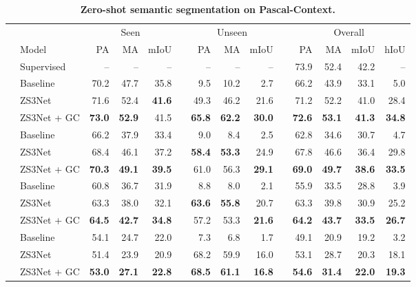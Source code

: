 \documentclass{article}
\begin{document}
\begin{table}
\caption{\small \textbf{Zero-shot semantic segmentation on Pascal-Context.}\vspace{3pt}}
\setlength{\tabcolsep}{5pt}
\small{
\begin{tabular}{clrrrrrrrrrrrr} \toprule
& & \multicolumn{3}{c}{Seen} && \multicolumn{3}{c}{Unseen} && \multicolumn{4}{c}{Overall}     \\\cline{3-5} \cline{7-9} \cline{11-14}\noalign{\smallskip}
 &Model           & PA    &MA    & mIoU  && PA    & MA    & mIoU    && PA    & MA   & mIoU  & hIoU \\ \midrule[1.1pt] 
&Supervised & -- & --  & -- && -- & -- & -- && 73.9  & 52.4 & 42.2 & -- \\ \hline\noalign{\smallskip}
\multirow{4}{*}{2} & Baseline & 70.2 & 47.7 & 35.8 && 9.5 & 10.2  & 2.7 && 66.2  & 43.9 & 33.1 &5.0 \\ 
&  ZS3Net & 71.6 &  52.4  & \bf 41.6 && 49.3  &   46.2  & 21.6 &&  71.2 & 52.2 &  41.0   & 28.4\\
&  ZS3Net + GC &  \bf 73.0 & \bf 52.9  &  41.5 && \bf 65.8  \bf  &  \bf 62.2  & \bf 30.0 && \bf 72.6  & \bf 53.1 & \bf 41.3 & \bf 34.8 \\ 
\hline\noalign{\smallskip}
\multirow{4}{*}{4} & Baseline & 66.2 & 37.9  & 33.4 && 9.0 & 8.4 & 2.5 && 62.8 & 34.6 & 30.7 & 4.7 \\ 
&  ZS3Net & 68.4 & 46.1  &  37.2 && \bf 58.4  \bf  &  \bf 53.3  &  24.9  &&  67.8 &  46.6 & 36.4 &  29.8 \\
&  ZS3Net + GC & \bf 70.3 & \bf 49.1  & \bf 39.5 &&  61.0  &  56.3  & \bf 29.1 && \bf 69.0 & \bf 49.7 & \bf 38.6 & \bf  33.5  \\ 
\hline\noalign{\smallskip}
\multirow{4}{*}{6} & Baseline &  60.8 & 36.7  & 31.9 && 8.8 & 8.0 & 2.1  && 55.9  & 33.5 & 28.8 & 3.9 \\ 
&  ZS3Net  &  63.3 &  38.0  &   32.1 && \bf  63.6  &  \bf 55.8 &  20.7 &&  63.3 &  39.8 & 30.9 &  25.2\\
&  ZS3Net + GC  & \bf 64.5  & \bf 42.7   & \bf 34.8 &&  57.2 &  53.3  & \bf 21.6  && \bf 64.2 & \bf 43.7  & \bf 33.5 & \bf 26.7 \\ \hline\noalign{\smallskip}
\multirow{4}{*}{8} & Baseline & 54.1 & 24.7  & 22.0 && 7.3 & 6.8 & 1.7 && 49.1 & 20.9 & 19.2 & 3.2 \\ 
&  ZS3Net  & 51.4 &  23.9 &  20.9   &&  68.2 \bf  & 59.9 \bf  &  16.0\bf  &&  53.1 &  28.7  &  20.3 & 18.1 \\
&  ZS3Net + GC  &  \bf 53.0  & \bf 27.1  & \bf 22.8 &&  \bf 68.5  &  \bf 61.1  & \bf 16.8 && \bf  54.6 & \bf 31.4  & \bf 22.0 & \bf  19.3 \\

\end{tabular}}
\end{table}
\end{document}
